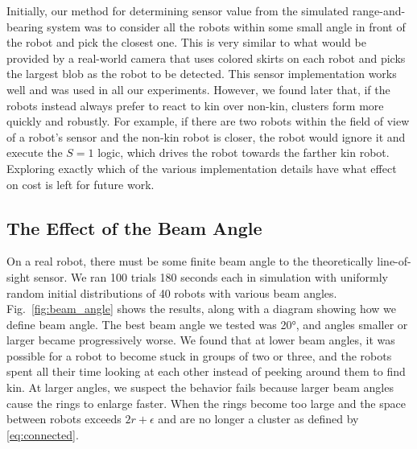 \documentclass[letterpaper, 10 pt, conference]{ieeeconf}
\begin{document}
  Initially, our method for determining sensor value from the simulated
  range-and-bearing system was to consider all the robots within some small angle
  in front of the robot and pick the closest one. This is very similar to what
  would be provided by a real-world camera that uses colored skirts on each robot
  and picks the largest blob as the robot to be detected. This sensor
  implementation works well and was used in all our experiments. However,
  we found later that, if the robots instead always prefer to react to kin over
  non-kin, clusters form more quickly and robustly. For example, if there are
  two robots within the field of view of a robot's sensor and the non-kin robot is
  closer, the robot would ignore it and execute the $S=1$ logic, which drives the
  robot towards the farther kin robot. Exploring exactly which of the various
  implementation details have what effect on cost is left for future work.

  \subsection{The Effect of the Beam Angle} \label{sec:aperture_angle}

  On a real robot, there must be some finite beam angle to the theoretically
  line-of-sight sensor. We ran 100 trials 180 seconds each in simulation with uniformly random
  initial distributions of 40 robots with various beam
  angles. Fig.~\ref{fig:beam_angle} shows the results, along with a diagram
  showing how we define beam angle. The best beam angle we tested was \ang{20},
  and angles smaller or larger became progressively worse. We found that at lower
  beam angles, it was possible for a robot to become stuck in groups of two or
  three, and the robots spent all their time looking at each other instead of
  peeking around them to find kin. At larger angles, we suspect the behavior fails
  because larger beam angles cause the rings to enlarge faster. When the rings become
  too large and the space between robots exceeds $2r+\epsilon$
  and are no longer a cluster as defined by \eqref{eq:connected}.
\end{document}
